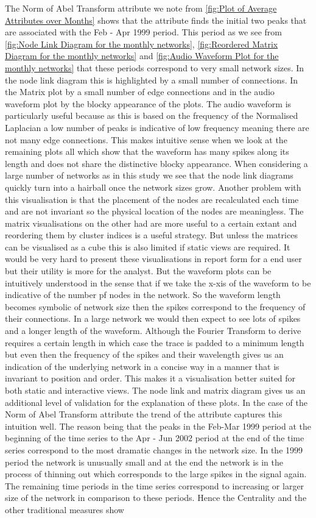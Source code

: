 The Norm of Abel Transform attribute we note from \ref{fig:Plot of Average Attributes over Months} shows that the attribute finds the initial two peaks that are associated with the Feb - Apr 1999 period. This period as we see from \ref{fig:Node Link Diagram for the monthly networks}, \ref{fig:Reordered Matrix Diagram for the monthly networks} and \ref{fig:Audio Waveform Plot for the monthly networks} that these periods correspond to very small network sizes. In the node link diagram this is highlighted by a small number of connections. In the Matrix plot by a small number of edge connections and in the audio waveform plot by the blocky appearance of the plots. The audio waveform is particularly useful because as this is based on the frequency of the Normalised Laplacian a low number of peaks is indicative of low frequency meaning there are not many edge connections. This makes intuitive sense when we look at the remaining plots all which show that the waveform has many spikes along its length and does not share the distinctive blocky appearance. When considering a large number of networks as in this study we see that the node link diagrams quickly turn into a hairball once the network sizes grow. Another problem with this visualisation is that the placement of the nodes are recalculated each time and are not invariant so the physical location of the nodes are meaningless. The matrix visualisations on the other had are more useful to a certain extant and reordering them by cluster indices is a useful strategy. But unless the matrices can be visualised as a cube this is also limited if static views are required. It would be very hard to present these visualisations in report form for a end user but their utility is more for the analyst. But the waveform plots can be intuitively understood in the sense that if we take the x-xis of the waveform to be indicative of the number pf nodes in the network. So the waveform length becomes symbolic of network size then the spikes correspond to the frequency of their connections. In a large network we would then expect to see lots of spikes and a longer length of the waveform. Although the Fourier Transform to derive requires a certain length in which case the trace is padded to a minimum length but even then the frequency of the spikes and their wavelength gives us an indication of the underlying network in a concise way in a manner that is invariant to position and order. This makes it a visualisation better suited for both static and interactive views. The node link and matrix diagram gives us an additional level of validation for the explanation of these plots. In the case of the Norm of Abel Transform attribute the trend of the attribute captures this intuition well. The reason being that the peaks in the Feb-Mar 1999 period at the beginning of the time series to the Apr - Jun 2002 period at the end of the time series correspond to the most dramatic changes in the network size. In the 1999 period the network is unusually small and at the end the network is in the process of thinning out which corresponds to the large spikes in the signal again. The remaining time periods in the time series correspond to increasing or larger size of the network in comparison to these periods. Hence the Centrality and the other traditional measures show 
